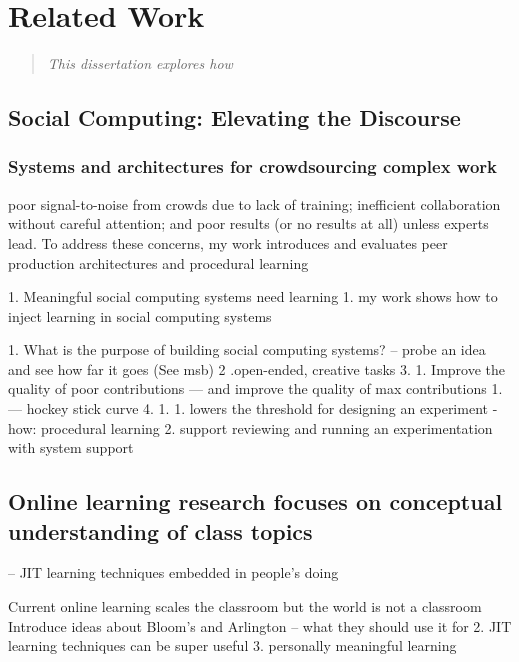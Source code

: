 
\chapter{Related Work}

\begin{quote}
\emph{This dissertation explores how }

\end{quote}
\vspace{0.25in}

\section{Social Computing: Elevating the Discourse}
\subsection{Systems and architectures for crowdsourcing complex work}

poor signal-to-noise from crowds due to lack of training; inefficient collaboration without careful attention; and poor results (or no results at all) unless experts lead. To address these concerns, my work introduces and evaluates peer production architectures and procedural learning

1. Meaningful social computing systems need learning
    1. my work shows how to inject learning in social computing systems


1. What is the purpose of building social computing systems?
-- probe an idea and see how far it goes (See msb)
2 .open-ended, creative tasks
3. 1. Improve the quality of poor contributions — and improve the quality of max contributions 
    1. — hockey stick curve 
4. 1. 
    1. lowers the threshold for designing an experiment - how: procedural learning
    2. support reviewing and running an experimentation with system support

\section{Online learning research focuses on conceptual understanding of class topics}
-- JIT learning techniques embedded in people’s doing

Current online learning scales the classroom but the world is not a classroom
Introduce ideas about Bloom's and Arlington -- what they should use it for
2. JIT learning techniques can be super useful
3. personally meaningful learning


